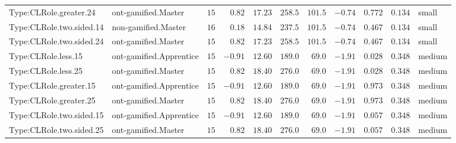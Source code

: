 \documentclass[6pt,a4paper]{article}
\begin{document}
{\begin{longtable}{llrrrrrrrrl}
Type:CLRole.greater.24&ont-gamified.Master&$15$&$ 0.82$&$17.23$&$ 258.5$&$101.5$&$-0.74$&$0.772$&$0.134$&small\tabularnewline
Type:CLRole.two.sided.14&non-gamified.Master&$16$&$ 0.18$&$14.84$&$ 237.5$&$101.5$&$-0.74$&$0.467$&$0.134$&small\tabularnewline
Type:CLRole.two.sided.24&ont-gamified.Master&$15$&$ 0.82$&$17.23$&$ 258.5$&$101.5$&$-0.74$&$0.467$&$0.134$&small\tabularnewline
Type:CLRole.less.15&ont-gamified.Apprentice&$15$&$-0.91$&$12.60$&$ 189.0$&$ 69.0$&$-1.91$&$0.028$&$0.348$&medium\tabularnewline
Type:CLRole.less.25&ont-gamified.Master&$15$&$ 0.82$&$18.40$&$ 276.0$&$ 69.0$&$-1.91$&$0.028$&$0.348$&medium\tabularnewline
Type:CLRole.greater.15&ont-gamified.Apprentice&$15$&$-0.91$&$12.60$&$ 189.0$&$ 69.0$&$-1.91$&$0.973$&$0.348$&medium\tabularnewline
Type:CLRole.greater.25&ont-gamified.Master&$15$&$ 0.82$&$18.40$&$ 276.0$&$ 69.0$&$-1.91$&$0.973$&$0.348$&medium\tabularnewline
\newpage
Type:CLRole.two.sided.15&ont-gamified.Apprentice&$15$&$-0.91$&$12.60$&$ 189.0$&$ 69.0$&$-1.91$&$0.057$&$0.348$&medium\tabularnewline
Type:CLRole.two.sided.25&ont-gamified.Master&$15$&$ 0.82$&$18.40$&$ 276.0$&$ 69.0$&$-1.91$&$0.057$&$0.348$&medium\tabularnewline
\hline
\end{longtable}}
\end{document}
